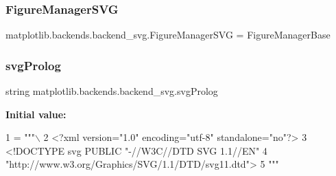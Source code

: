 \subsubsection{\texorpdfstring{Figure\+Manager\+S\+VG}{FigureManagerSVG}}
{\footnotesize\ttfamily matplotlib.\+backends.\+backend\+\_\+svg.\+Figure\+Manager\+S\+VG = Figure\+Manager\+Base}

\mbox{\label{namespacematplotlib_1_1backends_1_1backend__svg_ac21cb22c0b5fa90ac0af76323ff07568}} 
\subsubsection{\texorpdfstring{svg\+Prolog}{svgProlog}}
{\footnotesize\ttfamily string matplotlib.\+backends.\+backend\+\_\+svg.\+svg\+Prolog}

{\bfseries Initial value\+:}
\begin{DoxyCode}
1 =  \textcolor{stringliteral}{"""\(\backslash\)}
2 \textcolor{stringliteral}{<?xml version="1.0" encoding="utf-8" standalone="no"?>}
3 \textcolor{stringliteral}{<!DOCTYPE svg PUBLIC "-//W3C//DTD SVG 1.1//EN"}
4 \textcolor{stringliteral}{  "http://www.w3.org/Graphics/SVG/1.1/DTD/svg11.dtd">}
5 \textcolor{stringliteral}{"""}
\end{DoxyCode}
